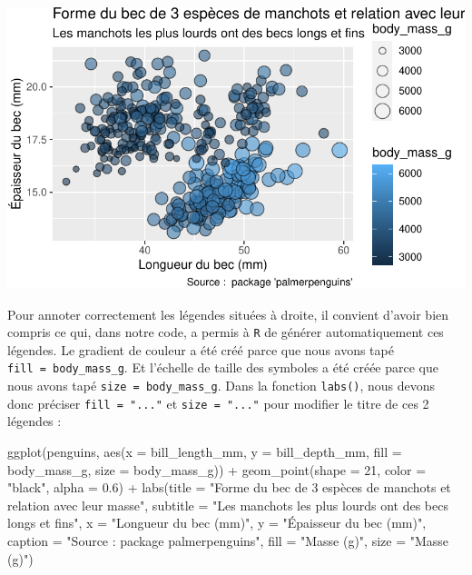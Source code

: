 \documentclass[
  a4paper,
  DIV=11,
  numbers=noendperiod,
  oneside]{scrreprt}
\newenvironment{Shaded}{}{}
\newcommand{\AttributeTok}[1]{\textcolor[rgb]{0.84,0.23,0.29}{#1}}
\newcommand{\DecValTok}[1]{\textcolor[rgb]{0.00,0.36,0.77}{#1}}
\newcommand{\FloatTok}[1]{\textcolor[rgb]{0.00,0.36,0.77}{#1}}
\newcommand{\FunctionTok}[1]{\textcolor[rgb]{0.44,0.26,0.76}{#1}}
\newcommand{\NormalTok}[1]{\textcolor[rgb]{0.14,0.16,0.18}{#1}}
\newcommand{\SpecialCharTok}[1]{\textcolor[rgb]{0.00,0.36,0.77}{#1}}
\newcommand{\StringTok}[1]{\textcolor[rgb]{0.01,0.18,0.38}{#1}}
\begin{document}
\includegraphics{03-visualization_files/figure-pdf/unnamed-chunk-88-1.pdf}

Pour annoter correctement les légendes situées à droite, il convient
d'avoir bien compris ce qui, dans notre code, a permis à \texttt{R} de
générer automatiquement ces légendes. Le gradient de couleur a été créé
parce que nous avons tapé \texttt{fill\ =\ body\_mass\_g}. Et l'échelle
de taille des symboles a été créée parce que nous avons tapé
\texttt{size\ =\ body\_mass\_g}. Dans la fonction \texttt{labs()}, nous
devons donc préciser \texttt{fill\ =\ "..."} et \texttt{size\ =\ "..."}
pour modifier le titre de ces 2 légendes :

\begin{Shaded}
\begin{Highlighting}[]
\FunctionTok{ggplot}\NormalTok{(penguins, }\FunctionTok{aes}\NormalTok{(}\AttributeTok{x =}\NormalTok{ bill\_length\_mm, }\AttributeTok{y =}\NormalTok{ bill\_depth\_mm,}
                     \AttributeTok{fill =}\NormalTok{ body\_mass\_g, }\AttributeTok{size =}\NormalTok{ body\_mass\_g)) }\SpecialCharTok{+}
  \FunctionTok{geom\_point}\NormalTok{(}\AttributeTok{shape =} \DecValTok{21}\NormalTok{, }\AttributeTok{color =} \StringTok{"black"}\NormalTok{, }\AttributeTok{alpha =} \FloatTok{0.6}\NormalTok{) }\SpecialCharTok{+}
  \FunctionTok{labs}\NormalTok{(}\AttributeTok{title =} \StringTok{"Forme du bec de 3 espèces de manchots et relation avec leur masse"}\NormalTok{,}
       \AttributeTok{subtitle =} \StringTok{"Les manchots les plus lourds ont des becs longs et fins"}\NormalTok{,}
       \AttributeTok{x =} \StringTok{"Longueur du bec (mm)"}\NormalTok{,}
       \AttributeTok{y =} \StringTok{"Épaisseur du bec (mm)"}\NormalTok{,}
       \AttributeTok{caption =} \StringTok{"Source :  package \textquotesingle{}palmerpenguins\textquotesingle{}"}\NormalTok{,}
       \AttributeTok{fill =} \StringTok{"Masse (g)"}\NormalTok{,}
       \AttributeTok{size =} \StringTok{"Masse (g)"}\NormalTok{)}
\end{Highlighting}
\end{Shaded}
\end{document}
